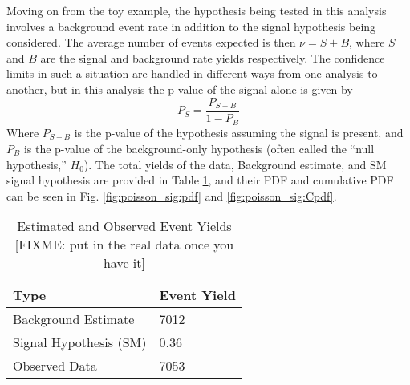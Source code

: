     Moving on from the toy example, the hypothesis being tested in this analysis
        involves a background event rate in addition to the signal hypothesis being considered.
    The average number of events expected is then $\nu = S + B$,
        where $S$ and $B$ are the signal and background rate yields respectively.
    The confidence limits in such a situation are handled in different ways from one analysis to another,
        but in this analysis the p-value of the signal alone is given by
    \begin{equation}
        P_S = \frac{P_{S+B}}{1 - P_B}
    \end{equation}
    Where $P_{S+B}$ is the p-value of the hypothesis assuming the signal is present,
        and $P_B$ is the p-value of the background-only hypothesis
        (often called the ``null hypothesis,'' $H_0$)\cite{Barlow:2019svl}.
    The total yields of the data, Background estimate, and SM signal hypothesis are provided in Table \ref{tab:event_yield},
        and their PDF and cumulative PDF can be seen in
        Fig. \ref{fig:poisson_sig:pdf} and \ref{fig:poisson_sig:Cpdf}.

    \begin{table}[tbh]
       \begin{center}
           \caption{Estimated and Observed Event Yields [FIXME: put in the real data once you have it]}
           \label{tab:event_yield}
           \footnotesize
           \begin{tabular}{|l|l|}
           \toprule
               Type  &	Event Yield \\
               \midrule
               Background Estimate  & 7012 \\
               Signal Hypothesis (SM) & 0.36 \\
               Observed Data & 7053 \\
           \bottomrule
           \end{tabular}
       \end{center}
    \end{table}

